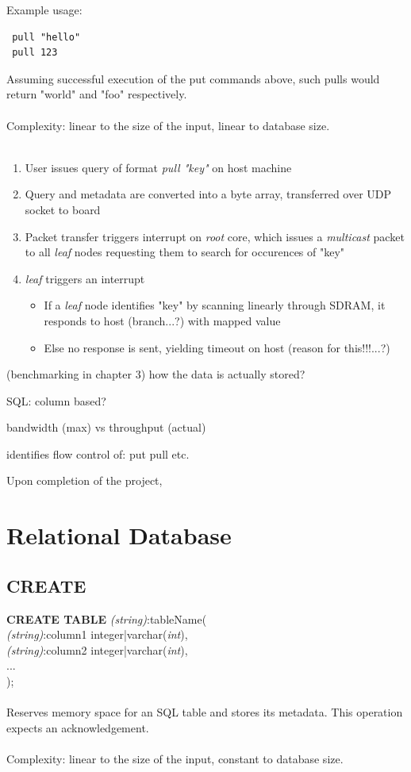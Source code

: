 \noindent
 Example usage:\\
 \begin{lstlisting}
 pull "hello"
 pull 123
 \end{lstlisting}
 Assuming successful execution of the put commands above, such pulls would return "world" and "foo" respectively.\\\\
 Complexity: linear to the size of the input, linear to database size.\\\\

\begin{enumerate}
\item User issues query of format \textit{pull "key"} on host machine
\item Query and metadata are converted into a byte array, transferred over UDP socket to board
\item Packet transfer triggers interrupt on \textit{root} core, which issues a \textit{multicast} packet to all \textit{leaf} nodes requesting them to search for occurences of "key"
\item \textit{leaf} triggers an interrupt
\begin{itemize}
\item If a \textit{leaf} node identifies "key" by scanning linearly through SDRAM, it responds to host (branch...?) with mapped value
\item Else no response is sent, yielding timeout on host (reason for this!!!...?)
\end{itemize}
\end{enumerate}


(benchmarking in chapter 3)
how the data is actually stored?

SQL:
column based?

bandwidth (max) vs throughput (actual)


identifies
flow control of:
put
pull
etc.

Upon completion of the project, 


\section{Relational Database}

\subsection{CREATE }
\noindent 
  {\large\textbf{CREATE TABLE} \textit{(string)}:tableName(\\
  	\textit{(string)}:column1 integer|varchar(\textit{int}),\\
  	\textit{(string)}:column2 integer|varchar(\textit{int}),\\
  	...\\
  	);}\\\\
\noindent
  Reserves memory space for an SQL table and stores its metadata. This operation expects an acknowledgement.\\\\
   Complexity: linear to the size of the input, constant to database size.\\\\
   
